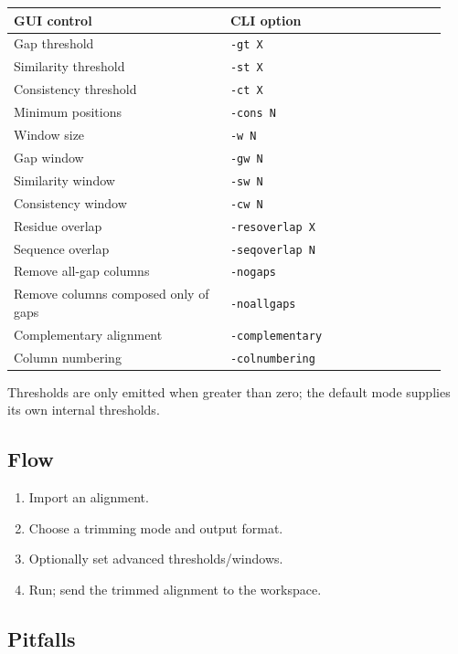 \documentclass[11pt]{report}
\begin{document}
{\footnotesize
\begin{longtable}{@{}>{\raggedright\arraybackslash}p{0.47\linewidth}>{\raggedright\arraybackslash}p{0.47\linewidth}@{}}
\toprule
GUI control & CLI option \\
\midrule
\endhead
Gap threshold & \texttt{-gt X} \\
Similarity threshold & \texttt{-st X} \\
Consistency threshold & \texttt{-ct X} \\
Minimum positions & \texttt{-cons N} \\
Window size & \texttt{-w N} \\
Gap window & \texttt{-gw N} \\
Similarity window & \texttt{-sw N} \\
Consistency window & \texttt{-cw N} \\
Residue overlap & \texttt{-resoverlap X} \\
Sequence overlap & \texttt{-seqoverlap N} \\
Remove all-gap columns & \texttt{-nogaps} \\
Remove columns composed only of gaps & \texttt{-noallgaps} \\
Complementary alignment & \texttt{-complementary} \\
Column numbering & \texttt{-colnumbering} \\
\bottomrule
\end{longtable}
}

Thresholds are only emitted when greater than zero; the default mode supplies its own internal thresholds.

\subsection{Flow}

\begin{enumerate}
  \item Import an alignment.
  \item Choose a trimming mode and output format.
  \item Optionally set advanced thresholds/windows.
  \item Run; send the trimmed alignment to the workspace.
\end{enumerate}

\subsection{Pitfalls}
\end{document}
